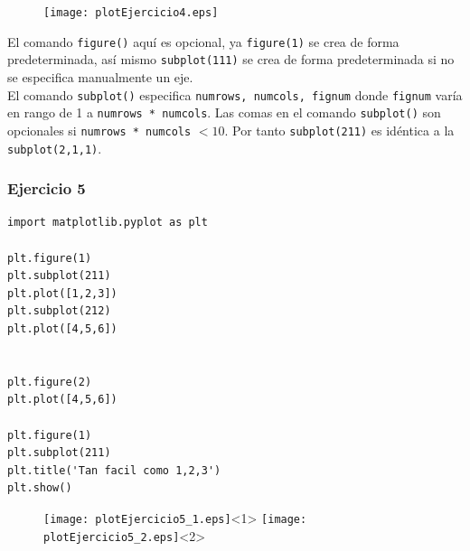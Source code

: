 \begin{frame}[fragile]
\begin{figure}
	\centering
	\texttt{[image: plotEjercicio4.eps]}
\end{figure}
\end{frame}
\begin{frame}
El comando \texttt{figure()} aquí es opcional, ya \texttt{figure(1)} se crea de forma predeterminada, así mismo \texttt{subplot(111)} se crea de forma predeterminada si no se especifica manualmente un eje.
\\
\medskip
El comando \texttt{subplot()} especifica \texttt{numrows, numcols, fignum} donde \texttt{fignum} varía en rango de 1 a \texttt{numrows * numcols}. Las comas en el comando \texttt{subplot()} son opcionales si \texttt{numrows * numcols} $<10$. Por tanto \texttt{subplot(211)} es idéntica a la \texttt{subplot(2,1,1)}.
\end{frame}
\begin{frame}[fragile]
\frametitle{Ejercicio 5}
\begin{lstlisting}
import matplotlib.pyplot as plt

plt.figure(1)                
plt.subplot(211)         
plt.plot([1,2,3])
plt.subplot(212)         
plt.plot([4,5,6])


plt.figure(2)                
plt.plot([4,5,6])           

plt.figure(1)                
plt.subplot(211)         
plt.title('Tan facil como 1,2,3')
plt.show()
\end{lstlisting}
\end{frame}
\begin{frame}[fragile]
\begin{figure}
	\centering
	\texttt{[image: plotEjercicio5\_1.eps]}<1>
	\texttt{[image: plotEjercicio5\_2.eps]}<2>
\end{figure}
\end{frame}
